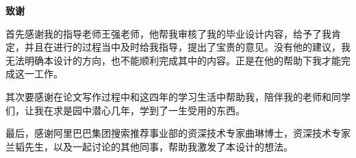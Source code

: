 \thispagestyle{previous}
\begin{center}
    \bfseries {} 致谢
\end{center}

首先感谢我的指导老师王强老师，他帮我审核了我的毕业设计内容，给予了我肯定，并且在进行的过程当中及时给我指导，提出了宝贵的意见。没有他的建议，我无法明确本设计的方向，也不能顺利完成其中的内容。正是在他的帮助下我才能完成这一工作。

其次要感谢在论文写作过程中和这四年的学习生活中帮助我，陪伴我的老师和同学们，让我在求是园中潜心几年，学到了一生受用的东西。

最后，感谢阿里巴巴集团搜索推荐事业部的资深技术专家曲琳博士，资深技术专家兰韬先生，以及一起讨论的其他同事，帮助我激发了本设计的想法。

